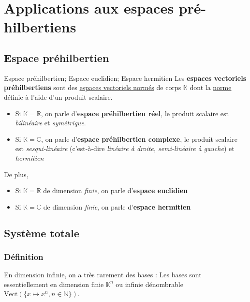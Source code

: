 \chapter{Applications aux espaces pré-hilbertiens}

\section{Espace préhilbertien} %
\label{sec:Vocabulaire}
\begin{Definition}[colbacktitle=red!75!black]{Espace préhilbertien; Espace euclidien; Espace hermitien}{}
Les \textbf{espaces vectoriels préhilbertiens} sont des \underline{espaces vectoriels normés} de corps $\mathbb{K}$ dont la \underline{norme} définie à l'aide d'un produit scalaire.
\begin{itemize}

    \item Si $\mathbb{K} = \mathbb{R}$, on parle d'\textbf{espace préhilbertien réel}, le produit scalaire est \textit{bilinéaire} et \textit{symétrique}. 
    \item Si $\mathbb{K} = \mathbb{C}$, on parle d'\textbf{espace préhilbertien complexe}, le produit scalaire est \textit{sesqui-linéaire} (c'est-à-dire \textit{linéaire à droite, semi-linéaire à gauche}) et \textit{hermitien}

\end{itemize}

De plus, 
\begin{itemize}
    \item Si $\mathbb{K} = \mathbb{R}$ de dimension \textit{finie}, on parle d'\textbf{espace euclidien}
    \item Si $\mathbb{K} = \mathbb{C}$ de dimension \textit{finie}, on parle d'\textbf{espace hermitien}

\end{itemize}

\end{Definition}

\section{Système totale} %
\label{sec:Système totale}

\subsection{Définition}
En dimension infinie, on a très rarement des bases : Les bases sont essentiellement en dimension finie $\mathbb{K}^{n}$ ou infinie dénombrable $\mathrm{Vect}(\{x \mapsto x ^{n}, n \in \mathbb{N}\})$. 

